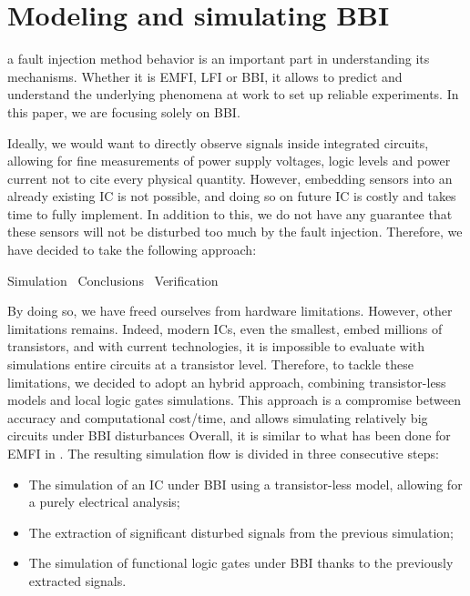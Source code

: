 
\section{Modeling and simulating BBI}
 a fault injection method behavior is an important part in understanding its mechanisms.
Whether it is EMFI, LFI or BBI, it allows to predict and understand the underlying phenomena at work to set up reliable experiments.
In this paper, we are focusing solely on BBI.

Ideally, we would want to directly observe signals inside integrated circuits, allowing for fine measurements of power supply voltages, logic levels and power current not to cite every physical quantity.
However, embedding sensors into an already existing IC is not possible, and doing so on future IC is costly and takes time to fully implement.
In addition to this, we do not have any guarantee that these sensors will not be disturbed too much by the fault injection.
Therefore, we have decided to take the following approach:
\begin{center}
	Simulation \textrightarrow\ Conclusions \textrightarrow\ Verification
\end{center}

By doing so, we have freed ourselves from hardware limitations.
However, other limitations remains.
Indeed, modern ICs, even the smallest, embed millions of transistors, and with current technologies, it is impossible to evaluate with simulations entire circuits at a transistor level.
Therefore, to tackle these limitations, we decided to adopt an hybrid approach, combining transistor-less models and local logic gates simulations.
This approach is a compromise between accuracy and computational cost/time, and allows simulating relatively big circuits under BBI disturbances
Overall, it is similar to what has been done for EMFI in \cite{mathieuEMFI}.
The resulting simulation flow is divided in three consecutive steps:
\begin{itemize}
	\item The simulation of an IC under BBI using a transistor-less model, allowing for a purely electrical analysis;
	\item The extraction of significant disturbed signals from the previous simulation;
	\item The simulation of functional logic gates under BBI thanks to the previously extracted signals.
\end{itemize}

